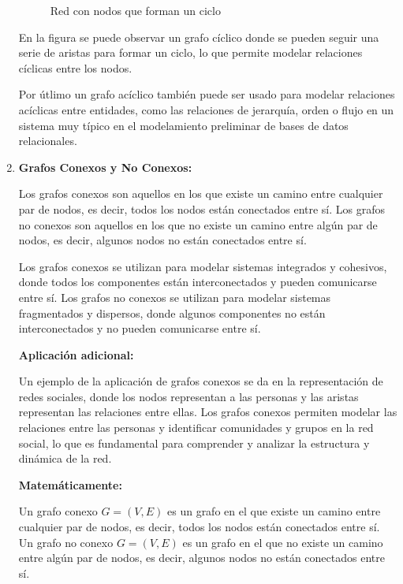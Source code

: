 \documentclass[11pt, a4paper]{article}
\begin{document}
\begin{enumerate}
\begin{figure}[H]
  \caption{Red con nodos que forman un ciclo}
  \label{fig:red-ciclica}
\end{figure}

En la figura se puede observar un grafo cíclico donde se pueden seguir una serie de aristas para formar un ciclo, lo que permite modelar relaciones cíclicas entre los nodos.

Por útlimo un grafo acíclico también puede ser usado para modelar relaciones acíclicas entre entidades, como las relaciones de jerarquía, orden o flujo en un sistema muy típico en el modelamiento preliminar de bases de datos relacionales.

\newpage

\item \textbf{Grafos Conexos y No Conexos:}

Los grafos conexos son aquellos en los que existe un camino entre cualquier par de nodos, es decir, todos los nodos están conectados entre sí. Los grafos no conexos son aquellos en los que no existe un camino entre algún par de nodos, es decir, algunos nodos no están conectados entre sí.

Los grafos conexos se utilizan para modelar sistemas integrados y cohesivos, donde todos los componentes están interconectados y pueden comunicarse entre sí. Los grafos no conexos se utilizan para modelar sistemas fragmentados y dispersos, donde algunos componentes no están interconectados y no pueden comunicarse entre sí.

\textbf{Aplicación adicional:}

Un ejemplo de la aplicación de grafos conexos se da en la representación de redes sociales, donde los nodos representan a las personas y las aristas representan las relaciones entre ellas. Los grafos conexos permiten modelar las relaciones entre las personas y identificar comunidades y grupos en la red social, lo que es fundamental para comprender y analizar la estructura y dinámica de la red.

\textbf{Matemáticamente:}

Un grafo conexo $G = (V, E)$ es un grafo en el que existe un camino entre cualquier par de nodos, es decir, todos los nodos están conectados entre sí. Un grafo no conexo $G = (V, E)$ es un grafo en el que no existe un camino entre algún par de nodos, es decir, algunos nodos no están conectados entre sí.


\end{enumerate}
\end{document}
